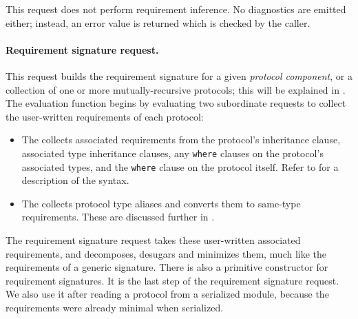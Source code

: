\documentclass[../generics]{subfiles}
\begin{document}
This request does not perform requirement inference. No diagnostics are emitted either; instead, an error value is returned which is checked by the caller.

\paragraph{Requirement signature request.} This request builds the requirement signature for a given \emph{protocol component}, or a collection of one or more mutually-recursive protocols; this will be explained in . The evaluation function begins by evaluating two subordinate requests to collect the user-written requirements of each protocol:
\begin{itemize}
\item The  collects associated requirements from the protocol’s inheritance clause, associated type inheritance clauses, any \texttt{where} clauses on the protocol’s associated types, and the \texttt{where} clause on the protocol itself. Refer to  for a description of the syntax.
\item The  collects protocol type aliases and converts them to same-type requirements. These are discussed further in .
\end{itemize}
The requirement signature request takes these user-written associated requirements, and decomposes, desugars and minimizes them, much like the requirements of a generic signature. There is also a primitive constructor for requirement signatures. It is the last step of the requirement signature request. We also use it after reading a protocol from a serialized module, because the requirements were already minimal when serialized.
\end{document}
